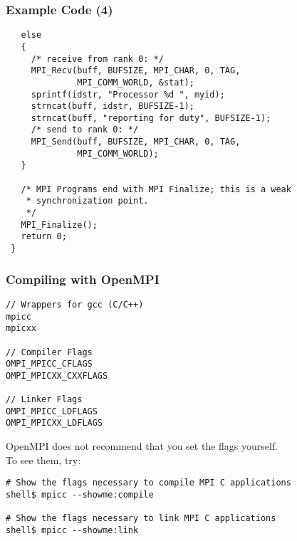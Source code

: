 \documentclass[aspectratio=43]{beamer}
\newenvironment{changemargin}[1]{%
  \begin{list}{}{%
    \setlength{\topsep}{0pt}%
    \setlength{\leftmargin}{#1}%
    \setlength{\rightmargin}{1em}
    \setlength{\listparindent}{\parindent}%
    \setlength{\itemindent}{\parindent}%
    \setlength{\parsep}{\parskip}%
  }%
  \item[]}{\end{list}}
\begin{document}
\begin{frame}[fragile]
  \frametitle{Example Code (4)}
  \begin{changemargin}{1cm}

  \begin{lstlisting}
   else
   {
     /* receive from rank 0: */
     MPI_Recv(buff, BUFSIZE, MPI_CHAR, 0, TAG,
              MPI_COMM_WORLD, &stat);
     sprintf(idstr, "Processor %d ", myid);
     strncat(buff, idstr, BUFSIZE-1);
     strncat(buff, "reporting for duty", BUFSIZE-1);
     /* send to rank 0: */
     MPI_Send(buff, BUFSIZE, MPI_CHAR, 0, TAG,
              MPI_COMM_WORLD);
   }
 
   /* MPI Programs end with MPI Finalize; this is a weak
    * synchronization point.
    */
   MPI_Finalize();
   return 0;
 }
  \end{lstlisting}
  \end{changemargin}
\end{frame}


\begin{frame}[fragile]
  \frametitle{Compiling with OpenMPI}
  \begin{changemargin}{1cm}

  \begin{lstlisting}
// Wrappers for gcc (C/C++)
mpicc
mpicxx

// Compiler Flags
OMPI_MPICC_CFLAGS
OMPI_MPICXX_CXXFLAGS

// Linker Flags
OMPI_MPICC_LDFLAGS
OMPI_MPICXX_LDFLAGS
  \end{lstlisting}

OpenMPI does not recommend that you set the flags yourself. \\ To see them, try:

  \begin{lstlisting}
# Show the flags necessary to compile MPI C applications
shell$ mpicc --showme:compile

# Show the flags necessary to link MPI C applications
shell$ mpicc --showme:link
  \end{lstlisting}
  \end{changemargin}
\end{frame}
\end{document}
